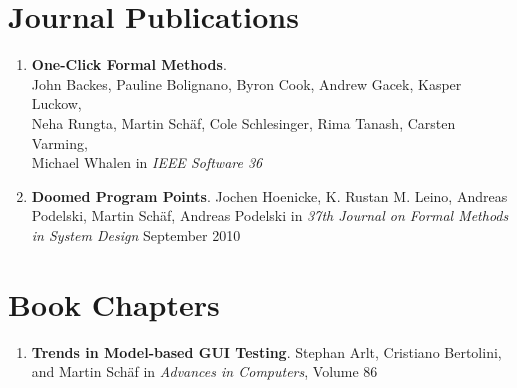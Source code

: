 


\section{\sc Journal Publications}

\begin{enumerate} \setcounter{enumi}{\value{saveenum}}

\item \textbf{One-Click Formal Methods}.
\\ John Backes, Pauline Bolignano, Byron Cook, Andrew Gacek, Kasper Luckow, \\
Neha Rungta, Martin Sch\"af, Cole Schlesinger, Rima Tanash, Carsten Varming, \\
Michael Whalen in 
\emph{IEEE Software 36}

\item  \textbf{Doomed Program Points}. Jochen Hoenicke, K. Rustan M. Leino,
Andreas Podelski, Martin Sch\"af, Andreas Podelski in
\emph{37th Journal on Formal Methods in System Design}
September 2010

\setcounter{saveenum}{\value{enumi}}
\end{enumerate}


\section{\sc Book Chapters}

\begin{enumerate} \setcounter{enumi}{\value{saveenum}}

  \item \textbf{Trends in Model-based GUI Testing}. Stephan Arlt, Cristiano
  Bertolini, and Martin Sch\"af in \emph{Advances in Computers}, Volume 86
  
 \setcounter{saveenum}{\value{enumi}} 
\end{enumerate}

\iffalse
\section{\sc Drafts and Technical Reports}

\begin{enumerate}\setcounter{enumi}{\value{saveenum}}
 \item \textbf{Towards Bounded Infeasible Code Detection}. J�rgen Christ, Jochen
 Hoenicke, and Martin Sch\"af, arXiv:1205.6527, May 2012 
 
 \item \textbf{Grey-box GUI Testing: Efficient Generation of Event Sequences}.
 Stephan Arlt, Cristiano Bertolini, Ishan Banerjee, Atif Memon, and Martin
 Sch\"af,\\ arXiv:1205.4928, May 2012 
 
 \item \textbf{Slicing Abstraction using Path Formulas}. Evren Ermis, Jochen
 Hoenicke, Andreas Podelski, and Martin Sch{\"a}f. UNU Technical Report Nr.
 449, June 2011
  
 \setcounter{saveenum}{\value{enumi}} 
\end{enumerate}
\fi

